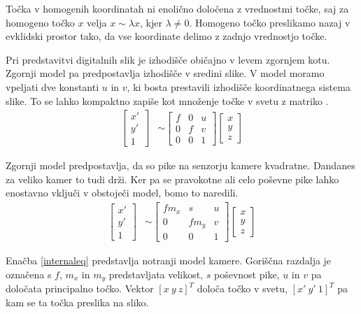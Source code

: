 \documentclass[a4paper, 12pt]{book}
\begin{document}
Točka v homogenih koordinatah ni enolično določena z vrednostmi točke, saj za homogeno točko $x$ velja $x \sim \lambda x$, kjer $\lambda \neq 0$. Homogeno točko preslikamo nazaj v evklidski prostor tako, da vse koordinate delimo z zadnjo vrednostjo točke. 

Pri predstavitvi digitalnih slik je izhodišče običajno v levem zgornjem kotu. Zgornji model pa predpostavlja izhodišče v sredini slike. V model moramo vpeljati dve konstanti $u$ in $v$, ki bosta prestavili izhodišče koordinatnega sistema slike. To se lahko kompaktno zapiše kot množenje točke v svetu z matriko \cite{Hartley2004, zhang2000flexible}.
\begin{align}
\begin{bmatrix}
x' \\
y' \\
1
\end{bmatrix}
&\sim
\begin{bmatrix}
f & 0 & u \\
0 & f & v \\
0 & 0 & 1
\end{bmatrix}
\begin{bmatrix}
x \\
y \\
z
\end{bmatrix}
\end{align}

Zgornji model predpostavlja, da so pike na senzorju kamere kvadratne. Dandanes za veliko kamer to tudi drži. Ker pa se pravokotne ali celo poševne pike lahko enostavno vključi v obstoječi model, bomo to naredili.
\begin{align}
\begin{bmatrix}
x' \\
y' \\
1
\end{bmatrix}
&\sim
\begin{bmatrix}
fm_x & s & u \\
0 & fm_y & v \\
0 & 0 & 1
\end{bmatrix}
\begin{bmatrix}
x \\
y \\
z
\end{bmatrix}
\label{internaleq}
\end{align}

Enačba \eqref{internaleq} predstavlja notranji model kamere. Goriščna razdalja je označena s $f$, $m_x$ in $m_y$ predstavljata velikost, $s$ poševnost pike, $u$ in $v$ pa določata principalno točko. Vektor $[x \ y \ z]^T$ določa točko v svetu, $[x' \ y' \ 1]^T$ pa kam se ta točka preslika na sliko.
\end{document}
